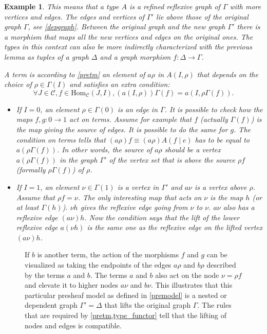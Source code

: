 \documentclass[12pt,a4paper,twoside,xetex]{book}
\newtheorem{example}[theorem]{Example}
\newcommand{\homo}[3]{\text{Hom}_{#1}\left(#2,#3\right)}
\begin{document}
\begin{example}
This means that a type $A$ is a refined reflexive graph of $\Gamma$ with more 
vertices and edges. The edges and vertices of $\Gamma '$ lie above those of the 
original graph $\Gamma$, see \cref{depgraph}. Between the original graph and 
the new graph $\Gamma'$ there is a morphism that maps all the new vertices and 
edges on the original ones. The types in this context can also be more 
indirectly characterized with the previous lemma as tuples of a graph $\Delta$ 
and a graph morphism $f:\Delta \rightarrow \Gamma$.

A term is according to \cref{pretm} an element of $a\rho$ in $A(I,\rho)$ that 
depends on the choice of $\rho \in \Gamma (I)$ and satisfies an extra 
condition: $$\forall J \in \mathcal{C}, f \in \homo{\mathcal{C}}{J}{I}, 
(a(I,\rho))\Gamma(f)= a(I,\rho \Gamma (f)).$$ 
\begin{itemize}

\item If $I=0$, an element $\rho \in \Gamma (0)$ is an edge in $\Gamma$. It is 
possible to check how the maps $f,g:0\rightarrow 1$ act on terms. Assume for 
example that $f$ (actually $\Gamma(f)$)  is the map giving the source of edges. 
It is possible to do the same for $g$. The condition on terms tells that 
$(a\rho)f \equiv (a \rho)A(f \mid e)$ has to be equal to $a(\rho \Gamma (f))$. 
In other words, the source of $a\rho$ should be a vertex $a(\rho \Gamma (f))$ 
in the graph $\Gamma '$ of the vertex set that is above the source $\rho f$ 
(formally $\rho \Gamma (f)$) of $\rho$. 


\item If $I = 1$, an  element $\nu \in \Gamma (1)$ is a vertex in $\Gamma '$ 
and $a\nu$ is a vertex above $\rho$. Assume that $\rho f = \nu$. The only 
interesting map that acts on $\nu$ is the map $h$ (or at least $\Gamma (h)$). 
$\nu h$ gives the reflexive edge going from $\nu$ to $\nu$. $a\nu$ also has a 
reflexive edge $(a\nu)h$. Now the condition says that the lift of the lower 
reflexive edge $a (\nu h)$ is the same one as the reflexive edge on the lifted 
vertex $(a \nu) h$. 
\end{itemize}
 
\end{example}

\begin{figure}\label{depgraphdiag}
\begin{center} 

\end{center}
\caption{If $b$ is another term,  the action of the morphisms 
$f$ and $g$ can be visualized as taking the endpoints of the edges $a\rho$ 
and $b\rho$ described by the terms $a$ and $b$. The terms $a$ and $b$ also act 
on the node $\nu = \rho f$ and elevate it to higher nodes $a\nu$ and $b\nu$. 
This illustrates that this particular presheaf model as defined in 
\cref{premodel} is a nested or dependent graph $\Gamma' = \Delta$ that lifts 
the original graph $\Gamma$.
The rules that are required by \cref{pretm,type_functor} tell that the lifting 
of nodes and edges is compatible.}
\end{figure}
\end{document}
